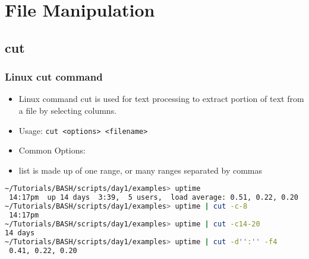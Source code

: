 \documentclass[slidestop,mathserif,compress,xcolor=svgnames]{beamer}
\begin{document}
\section{File Manipulation}
\subsection{cut}
\begin{frame}[fragile]
  \frametitle{\small Linux cut command}
  \begin{itemize}
    \item Linux command cut is used for text processing to extract portion of text from a file by selecting columns.
    \item Usage: \texttt{cut <options> <filename>}
    \item Common Options:
    \item list is made up of one range, or many ranges separated by commas
  \end{itemize}
  \begin{lstlisting}[language=bash]
~/Tutorials/BASH/scripts/day1/examples> uptime 
 14:17pm  up 14 days  3:39,  5 users,  load average: 0.51, 0.22, 0.20
~/Tutorials/BASH/scripts/day1/examples> uptime | cut -c-8
 14:17pm
~/Tutorials/BASH/scripts/day1/examples> uptime | cut -c14-20
14 days
~/Tutorials/BASH/scripts/day1/examples> uptime | cut -d'':'' -f4
 0.41, 0.22, 0.20
  \end{lstlisting}
\end{frame}
\end{document}
